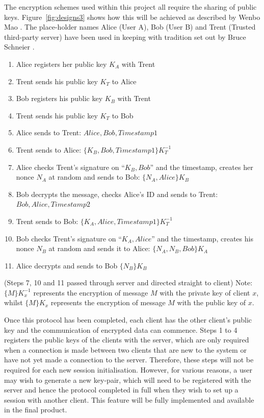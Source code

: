 \documentclass[a4paper,11pt]{article}
\begin{document}
The encryption schemes used within this project all require the sharing of public keys. Figure~\ref{fig:designs3} shows how this will be achieved as described by Wenbo Mao \cite{wenbomao}. The place-holder names Alice (User A), Bob (User B) and Trent (Trusted third-party server) have been used in keeping with tradition set out by Bruce Schneier \cite{bruceschneier}.

\begin{enumerate}
  \item Alice registers her public key $ K_{A} $ with Trent
  \item Trent sends his public key $ K_{T} $ to Alice
  \item Bob registers his public key $ K_{B} $ with Trent
  \item Trent sends his public key $ K_{T} $ to Bob
  \item Alice sends to Trent: $ Alice, Bob, Timestamp1 $
  \item Trent sends to Alice: $ \{K_{B},Bob, Timestamp1\} K_{T}^{-1} $
  \item Alice checks Trent’s signature on “$ {K_{B},Bob} $” and the timestamp, creates her nonce $ N_{A} $ at random and sends to Bob: $ \{N_{A} , Alice \}K_{B} $
  \item Bob decrypts the message, checks Alice’s ID and sends to Trent: $ Bob, Alice, Timestamp2 $
  \item Trent sends to Bob: $ \{K_{A} , Alice, Timestamp1\}K_{T}^{-1} $
  \item Bob checks Trent’s signature on “$ K_{A}, Alice $” and the timestamp, creates his nonce $ N_{B} $ at random and sends it to Alice: $ \{N_{A}, N_{B}, Bob\}K_{A} $
  \item Alice decrypts and sends to Bob $ \{N_{B}\}K_{B} $
\end{enumerate}

(Steps 7, 10 and 11 passed through server and directed straight to client)
Note: $ \{M\}K_{x}^{-1} $ represents the encryption of message $ M $ with the private key of client $ x $, whilst $ \{M\}K_{x} $ represents the encryption of message $ M $ with the public key of $ x $.

Once this protocol has been completed, each client has the other client’s public key and the communication of encrypted data can commence. Steps 1 to 4 registers the public keys of the clients with the server, which are only required when a connection is made between two clients that are new to the system or have not yet made a connection to the server. Therefore, these steps will not be required for each new session initialisation. However, for various reasons, a user may wish to generate a new key-pair, which will need to be registered with the server and hence the protocol completed in full when they wish to set up a session with another client. This feature will be fully implemented and available in the final product. 
\end{document}
